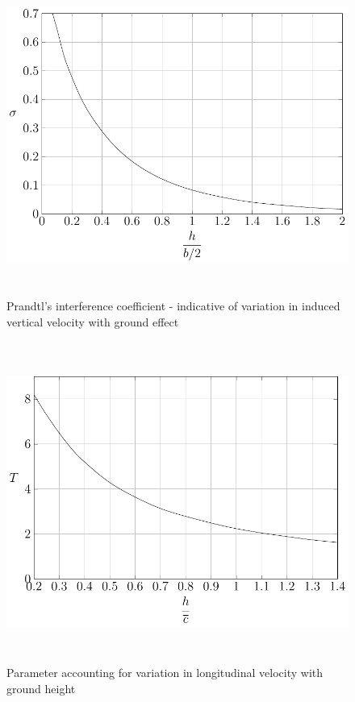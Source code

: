 \begin{figure}[H]
	\centering
	\includegraphics[height=10.5cm, keepaspectratio ]{Immagini/Capitolo2/2_12-(Delta_alpha_G)_sigma_vs_2hfracb} 
	\caption{Prandtl's interference coefficient - indicative of variation in induced vertical velocity with ground effect} %
	\label{fig:figura2_12} %
\end{figure}

\begin{figure}[H]
	\centering
	\includegraphics[height=10.5cm, keepaspectratio ]{Immagini/Capitolo2/2_13-(Delta_alpha_G)_T_vs_h_frac_overline_c} 
	\caption{Parameter accounting for variation in longitudinal velocity with ground height} %
	\label{fig:figura2_13} %
\end{figure}

